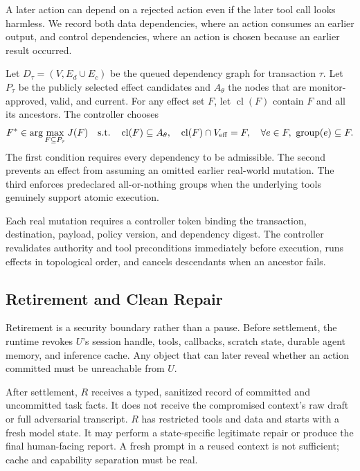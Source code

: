 \documentclass[10pt]{article}
\begin{document}
A later action can depend on a rejected action even if the later tool call looks harmless. We record both data dependencies, where an action consumes an earlier output, and control dependencies, where an action is chosen because an earlier result occurred.

Let $D_\tau=(V,E_d\cup E_c)$ be the queued dependency graph for transaction $\tau$. Let $P_\tau$ be the publicly selected effect candidates and $A_\theta$ the nodes that are monitor-approved, valid, and current. For any effect set $F$, let $\operatorname{cl}(F)$ contain $F$ and all its ancestors. The controller chooses
\begin{equation}
F^*\in\arg\max_{F\subseteq P_\tau}J(F)
\quad\text{s.t.}\quad
\operatorname{cl}(F)\subseteq A_\theta,
\quad
\operatorname{cl}(F)\cap V_{\rm eff}=F,
\quad
\forall e\in F,\ \operatorname{group}(e)\subseteq F.
\label{eq:settlement}
\end{equation}
The first condition requires every dependency to be admissible. The second prevents an effect from assuming an omitted earlier real-world mutation. The third enforces predeclared all-or-nothing groups when the underlying tools genuinely support atomic execution.

Each real mutation requires a controller token binding the transaction, destination, payload, policy version, and dependency digest. The controller revalidates authority and tool preconditions immediately before execution, runs effects in topological order, and cancels descendants when an ancestor fails.

\subsection{Retirement and Clean Repair}

Retirement is a security boundary rather than a pause. Before settlement, the runtime revokes $U$'s session handle, tools, callbacks, scratch state, durable agent memory, and inference cache. Any object that can later reveal whether an action committed must be unreachable from $U$.

After settlement, $R$ receives a typed, sanitized record of committed and uncommitted task facts. It does not receive the compromised context's raw draft or full adversarial transcript. $R$ has restricted tools and data and starts with a fresh model state. It may perform a state-specific legitimate repair or produce the final human-facing report. A fresh prompt in a reused context is not sufficient; cache and capability separation must be real.
\end{document}
